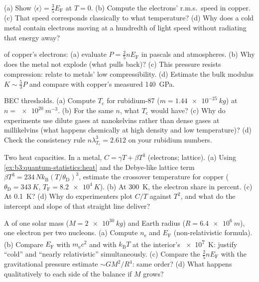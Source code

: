 \begin{exercise}[$\star$]\label{exo:b3:quantum-statistics:2}
(a) Show $\langle\epsilon\rangle = \tfrac35 E_{\text{F}}$ at $T =
0$. (b) Compute the electrons' r.m.s.\ speed in copper. (c) That
speed corresponds classically to what temperature? (d) Why does a
cold metal contain electrons moving at a hundredth of light speed
without radiating that energy away?
\end{exercise}

\begin{exercise}[$\star$]\label{exo:b3:quantum-statistics:3}
 of copper's electrons: (a) evaluate $P =
\tfrac25 nE_{\text{F}}$ in pascals and atmospheres. (b) Why does
the metal not explode (what pulls back)? (c) This pressure resists
compression: relate to metals' low compressibility. (d) Estimate
the bulk modulus $K \sim \tfrac53 P$ and compare with copper's
measured \qty{140}{GPa}.
\end{exercise}

\begin{exercise}[$\star$]\label{exo:b3:quantum-statistics:4}
BEC thresholds. (a) Compute $T_{\text{c}}$ for rubidium-87 ($m =
\qty{1.44e-25}{kg}$) at $n = \qty{e20}{m^{-3}}$. (b) For the same
$n$, what $T_{\text{c}}$ would  have? (c) Why do
experiments use dilute gases at nanokelvins rather than dense
gases at millikelvins (what happens chemically at high density and
low temperature)? (d) Check the consistency rule $n\lambda_{T_c}^3
= 2.612$ on your rubidium numbers.
\end{exercise}

\begin{exercise}[$\star\star$]\label{exo:b3:quantum-statistics:5}
Two heat capacities. In a metal, $C = \gamma T +
\beta T^3$ (electrons; lattice). (a) Using
\cref{ex:b3:quantum-statistics:heat} and the Debye-like lattice
term $\beta T^3 = 234\,Nk_{\text{B}}(T/\theta_{\text{D}})^3$,
estimate the crossover temperature for copper
($\theta_{\text{D}} = \qty{343}{K}$, $T_{\text{F}} =
\qty{8.2e4}{K}$). (b) At \qty{300}{K}, the electron share in
percent. (c) At \qty{0.1}{K}? (d) Why do experimenters plot $C/T$
against $T^2$, and what do the intercept and slope of that
straight line deliver?
\end{exercise}

\begin{exercise}[$\star\star$]\label{exo:b3:quantum-statistics:6}
A  of one solar mass ($M = \qty{2e30}{kg}$) and Earth
radius ($R = \qty{6.4e6}{m}$), one electron per two nucleons. (a)
Compute $n_{\text{e}}$ and $E_{\text{F}}$ (non-relativistic
formula). (b) Compare $E_{\text{F}}$ with $m_{\text{e}}c^2$ and
with $k_{\text{B}}T$ at the interior's \qty{e7}{K}: justify
``cold'' and ``nearly relativistic'' simultaneously. (c) Compare
the  $\tfrac25 nE_{\text{F}}$ with the
gravitational pressure estimate $\sim GM^2/R^4$: same order? (d) What happens qualitatively to
each side of the balance if $M$ grows?
\end{exercise}

